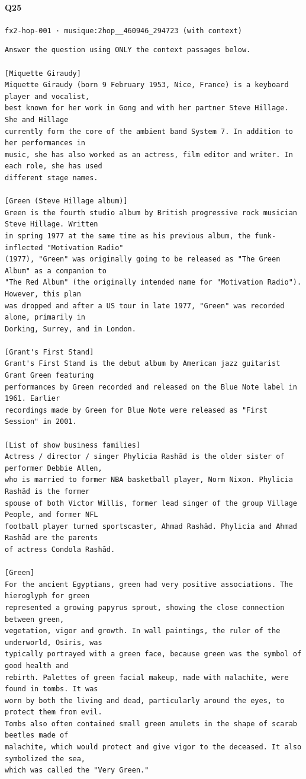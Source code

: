 \documentclass[10pt]{article}
\begin{document}
\paragraph{Q25} \texttt{fx2-hop-001  ·  musique:2hop\_\_460946\_294723 (with context)}
\begin{verbatim}
Answer the question using ONLY the context passages below.

[Miquette Giraudy]
Miquette Giraudy (born 9 February 1953, Nice, France) is a keyboard player and vocalist,
best known for her work in Gong and with her partner Steve Hillage. She and Hillage
currently form the core of the ambient band System 7. In addition to her performances in
music, she has also worked as an actress, film editor and writer. In each role, she has used
different stage names.

[Green (Steve Hillage album)]
Green is the fourth studio album by British progressive rock musician Steve Hillage. Written
in spring 1977 at the same time as his previous album, the funk-inflected "Motivation Radio"
(1977), "Green" was originally going to be released as "The Green Album" as a companion to
"The Red Album" (the originally intended name for "Motivation Radio"). However, this plan
was dropped and after a US tour in late 1977, "Green" was recorded alone, primarily in
Dorking, Surrey, and in London.

[Grant's First Stand]
Grant's First Stand is the debut album by American jazz guitarist Grant Green featuring
performances by Green recorded and released on the Blue Note label in 1961. Earlier
recordings made by Green for Blue Note were released as "First Session" in 2001.

[List of show business families]
Actress / director / singer Phylicia Rashād is the older sister of performer Debbie Allen,
who is married to former NBA basketball player, Norm Nixon. Phylicia Rashād is the former
spouse of both Victor Willis, former lead singer of the group Village People, and former NFL
football player turned sportscaster, Ahmad Rashād. Phylicia and Ahmad Rashād are the parents
of actress Condola Rashād.

[Green]
For the ancient Egyptians, green had very positive associations. The hieroglyph for green
represented a growing papyrus sprout, showing the close connection between green,
vegetation, vigor and growth. In wall paintings, the ruler of the underworld, Osiris, was
typically portrayed with a green face, because green was the symbol of good health and
rebirth. Palettes of green facial makeup, made with malachite, were found in tombs. It was
worn by both the living and dead, particularly around the eyes, to protect them from evil.
Tombs also often contained small green amulets in the shape of scarab beetles made of
malachite, which would protect and give vigor to the deceased. It also symbolized the sea,
which was called the "Very Green."


\end{verbatim}
\end{document}
